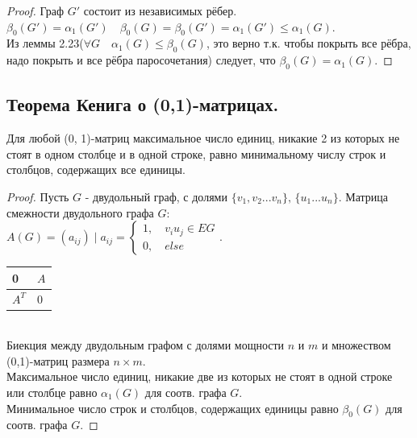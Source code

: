 \documentclass[12pt]{article}
\begin{document}
\begin{proof}
	Граф $G'$ состоит из независимых рёбер. $\beta_0(G') = \alpha_1(G') \quad \beta_0(G) = \beta_0(G') = \alpha_1(G') \le \alpha_1(G)$.\\
	Из леммы 2.23($\forall G \quad \alpha_1(G) \leqslant \beta_0(G)$, это верно т.к. чтобы покрыть все рёбра, надо покрыть и все рёбра паросочетания) следует, что $\beta_0(G) = \alpha_1(G)$.
	\end{proof}
	\subsection{Теорема Кенига о (0,1)-матрицах.}
			Для любой (0, 1)-матриц максимальное число единиц, никакие 2 из которых не стоят в одном столбце и в одной строке, равно минимальному числу строк и столбцов,
	содержащих все единицы.
	\begin{proof}
		Пусть $G$ - двудольный граф, с долями $\{ v_1, v_2 ... v_n\}, \, \{ u_1 ... u_n \}$. Матрица смежности двудольного графа $G$:\\
		$A(G) = (a_{ij}) \mid a_{ij} = \begin{cases} 1,  \quad v_iu_j \in EG \\ 0, \quad else \end{cases}$. \quad
\begin{tabular}{|l|l|}
\hline
0 & $A$\\
\hline
$A^T$ & 0 \\
\hline		                                                                                                          \end{tabular}\\
		Биекция между двудольным графом с долями мощности $n$ и $m$ и множеством (0,1)-матриц размера $n\times m$.\\
		Максимальное число единиц, никакие две из которых не стоят в одной строке или столбце равно $\alpha_1(G)$ для соотв. графа $G$.\\
		Минимальное число строк и столбцов, содержащих единицы равно $\beta_0(G)$ для соотв. графа $G$.
	\end{proof}
\end{document}
